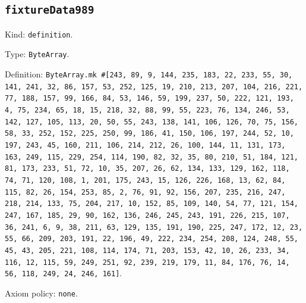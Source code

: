 \documentclass[11pt]{article}
\begin{document}
\subsection*{\texttt{fixtureData989}}
\noindent Kind: \texttt{definition}.\par
\noindent Type: \texttt{ByteArray}.\par
\noindent Definition: \texttt{ByteArray.mk \#[243, 89, 9, 144, 235, 183, 22, 233, 55, 30, 141, 241, 32, 86, 157, 53, 252, 125, 19, 210, 213, 207, 104, 216, 221, 77, 188, 157, 99, 166, 84, 53, 146, 59, 199, 237, 50, 222, 121, 193, 4, 75, 234, 65, 18, 15, 218, 32, 88, 99, 55, 223, 76, 134, 246, 53, 142, 127, 105, 113, 20, 50, 55, 243, 138, 141, 106, 126, 70, 75, 156, 58, 33, 252, 152, 225, 250, 99, 186, 41, 150, 106, 197, 244, 52, 10, 197, 243, 45, 160, 211, 106, 214, 212, 26, 100, 144, 11, 131, 173, 163, 249, 115, 229, 254, 114, 190, 82, 32, 35, 80, 210, 51, 184, 121, 81, 173, 233, 51, 72, 10, 35, 207, 26, 62, 134, 133, 129, 162, 118, 74, 71, 120, 108, 1, 201, 175, 243, 15, 126, 226, 168, 13, 62, 84, 115, 82, 26, 154, 253, 85, 2, 76, 91, 92, 156, 207, 235, 216, 247, 218, 214, 133, 75, 204, 217, 10, 152, 85, 109, 140, 54, 77, 121, 154, 247, 167, 185, 29, 90, 162, 136, 246, 245, 243, 191, 226, 215, 107, 36, 241, 6, 9, 38, 211, 63, 129, 135, 191, 190, 225, 247, 172, 12, 23, 55, 66, 209, 203, 191, 22, 196, 49, 222, 234, 254, 208, 124, 248, 55, 45, 43, 205, 221, 108, 114, 174, 71, 203, 153, 42, 10, 26, 233, 34, 116, 12, 115, 59, 249, 251, 92, 239, 219, 179, 11, 84, 176, 76, 14, 56, 118, 249, 24, 246, 161]}.\par
\noindent Axiom policy: \texttt{none}.\par
\end{document}

